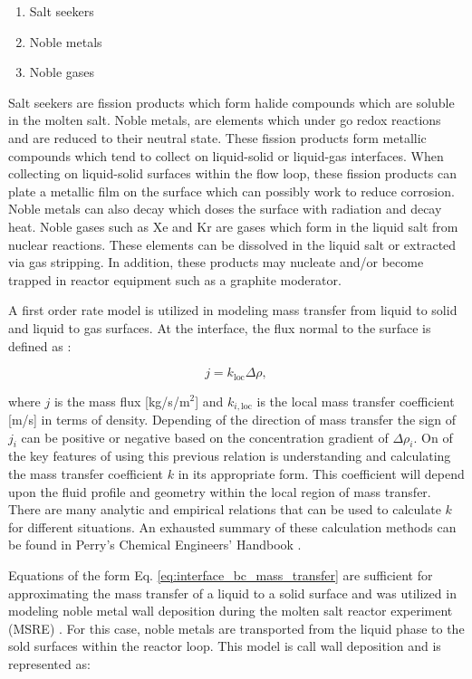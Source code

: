 \begin{enumerate}
    \item Salt seekers
    \item Noble metals
    \item Noble gases
\end{enumerate}

\noindent Salt seekers are fission products which form halide compounds which are soluble in the molten salt. Noble metals, are elements which under go redox reactions and are reduced to their neutral state. These fission products form metallic compounds which tend to collect on liquid-solid or liquid-gas interfaces. When collecting on liquid-solid surfaces within the flow loop, these fission products can plate a metallic film on the surface which can possibly work to reduce corrosion. Noble metals can also decay which doses the surface with radiation and decay heat. Noble gases such as Xe and Kr are gases which form in the liquid salt from nuclear reactions. These elements can be dissolved in the liquid salt or extracted via gas stripping. In addition, these products may nucleate and/or become trapped in reactor equipment such as a graphite moderator. 

A first order rate model is utilized in modeling mass transfer from liquid to solid and liquid to gas surfaces. At the interface, the flux normal to the surface is defined as \cite{bird2006}:

\begin{equation}
    j = k_{\text{loc}} \Delta \rho,
    \label{eq:interface_bc_mass_transfer}
\end{equation}

\noindent where $j$ is the mass flux [kg/s/m$^{2}$] and $k_{i, \text{loc}}$ is the local mass transfer coefficient [m/s] in terms of density. Depending of the direction of mass transfer the sign of $j_{i}$ can be positive or negative based on the concentration gradient of $\Delta \rho_{i}$. On of the key features of using this previous relation is understanding and calculating the mass transfer coefficient $k$ in its appropriate form. This coefficient will depend upon the fluid profile and geometry within the local region of mass transfer. There are many analytic and empirical relations that can be used to calculate $k$ for different situations. An exhausted summary of these calculation methods can be found in Perry's Chemical Engineers' Handbook \cite{perry2007}.

Equations of the form Eq. \ref{eq:interface_bc_mass_transfer} are sufficient for approximating the mass transfer of a liquid to a solid surface and was utilized in modeling noble metal wall deposition during the molten salt reactor experiment (MSRE) \cite{kedl1972}. For this case, noble metals are transported from the liquid phase to the sold surfaces within the reactor loop. This model is call wall deposition and is represented as:

